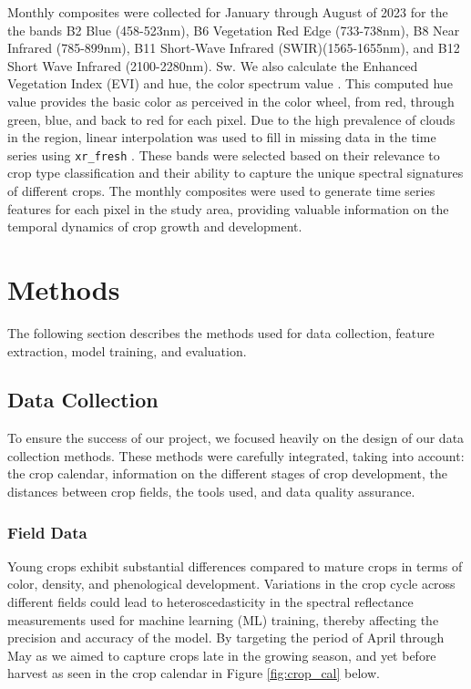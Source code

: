 \documentclass[
  journal,
  twocolumn]{IEEEtran}
\begin{document}
Monthly composites were collected for January through August of 2023 for
the the bands B2 Blue (458-523nm), B6 Vegetation Red Edge (733-738nm),
B8 Near Infrared (785-899nm), B11 Short-Wave Infrared
(SWIR)(1565-1655nm), and B12 Short Wave Infrared (2100-2280nm). Sw. We
also calculate the Enhanced Vegetation Index (EVI) and hue, the color
spectrum value \citep{GoogleHSV}. This computed hue value provides the
basic color as perceived in the color wheel, from red, through green,
blue, and back to red for each pixel. Due to the high prevalence of
clouds in the region, linear interpolation was used to fill in missing
data in the time series using \texttt{xr\_fresh} \citep{xr_fresh_2021}.
These bands were selected based on their relevance to crop type
classification and their ability to capture the unique spectral
signatures of different crops. The monthly composites were used to
generate time series features for each pixel in the study area,
providing valuable information on the temporal dynamics of crop growth
and development.

\section{Methods}\label{methods}

The following section describes the methods used for data collection,
feature extraction, model training, and evaluation.

\subsection{Data Collection}\label{data-collection}

To ensure the success of our project, we focused heavily on the design
of our data collection methods. These methods were carefully integrated,
taking into account: the crop calendar, information on the different
stages of crop development, the distances between crop fields, the tools
used, and data quality assurance.

\subsubsection{Field Data}\label{field-data}

Young crops exhibit substantial differences compared to mature crops in
terms of color, density, and phenological development. Variations in the
crop cycle across different fields could lead to heteroscedasticity in
the spectral reflectance measurements used for machine learning (ML)
training, thereby affecting the precision and accuracy of the model. By
targeting the period of April through May as we aimed to capture crops
late in the growing season, and yet before harvest as seen in the crop
calendar in Figure \ref{fig:crop_cal} below.
\end{document}
